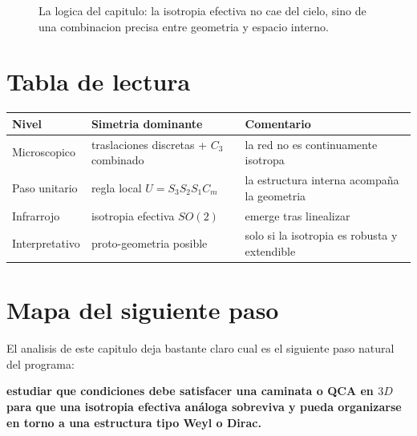 \begin{figure}[h!]
\centering
{}
\caption{La logica del capitulo: la isotropia efectiva no cae del cielo, sino de una combinacion precisa entre geometria y espacio interno.}
\end{figure}

\section{Tabla de lectura}
\begin{center}
\begin{tabular}{p{4.1cm} p{4.8cm} p{5.3cm}}
\toprule
Nivel & Simetria dominante & Comentario \\
\midrule
Microscopico & traslaciones discretas + \(C_3\) combinado & la red no es continuamente isotropa \\
Paso unitario & regla local \(U=S_3S_2S_1C_m\) & la estructura interna acompa\~na la geometria \\
Infrarrojo & isotropia efectiva \(SO(2)\) & emerge tras linealizar \\
Interpretativo & proto-geometria posible & solo si la isotropia es robusta y extendible \\
\bottomrule
\end{tabular}
\end{center}

\section{Mapa del siguiente paso}
El analisis de este capitulo deja bastante claro cual es el siguiente paso natural del programa:
\begin{displayquote}
\textbf{estudiar que condiciones debe satisfacer una caminata o QCA en \(3D\) para que una isotropia efectiva análoga sobreviva y pueda organizarse en torno a una estructura tipo Weyl o Dirac.}
\end{displayquote}


